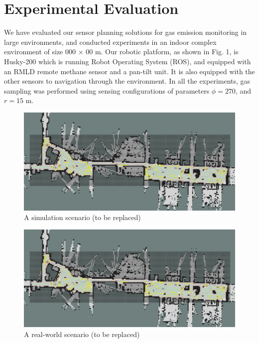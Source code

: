 \section{Experimental Evaluation}

We have evaluated our sensor planning solutions for gas emission monitoring in large environments, and conducted experiments in an indoor complex environment of size 000 $\times$ 00 m. Our robotic platform, as shown in Fig. 1, is Husky-200 which is running Robot Operating System (ROS), and equipped with an RMLD remote methane sensor and a pan-tilt unit. It is also equipped with the other sensors to navigation through the environment. In all the experiments, gas sampling was performed using sensing configurations of parameters $\phi = 270$\dg, and $r = 15$ m. 







\begin{figure}[h!]
	\centering
	\includegraphics[trim={35 160 25 150}, clip,width=1\linewidth,angle=0]{fig/5-10-1se.png}
	\caption{A simulation scenario (to be replaced)}
	\label{fig:simulation}
\end{figure}



\begin{figure}[h!]
	\centering
	\includegraphics[trim={35 160 25 150}, clip,width=1\linewidth,angle=0]{fig/5-10-1se.png}
	\caption{A real-world scenario (to be replaced)}
	\label{fig:real-world}
\end{figure}

